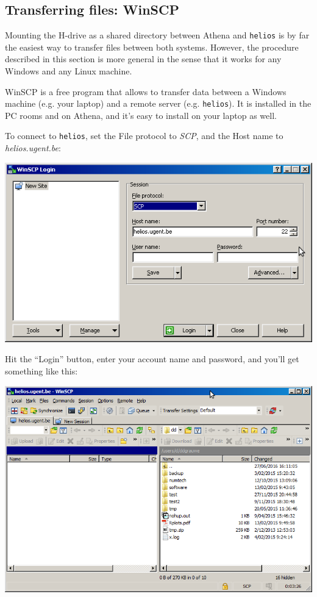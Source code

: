 \documentclass[a4paper]{article}
\begin{document}
\subsection{Transferring files: WinSCP\label{app:WinSCP}}
%
\par
Mounting the H-drive as a shared directory between Athena and \texttt{helios} is by far the easiest way to transfer files between both systems. However, the procedure described in this section is more general in the sense that it works for any Windows and any Linux machine.
%
\par
WinSCP is a free program that allows to transfer data between a Windows machine (e.g. your laptop) and a remote server (e.g. \texttt{helios}). It is installed in the PC rooms and on Athena, and it's easy to install on your laptop as well.
%
\par
To connect to \texttt{helios}, set the File protocol to \emph{SCP}, and the Host name to \emph{helios.ugent.be}:
%
\begin{center}
	\includegraphics[scale=.5]{winscp1.png}
\end{center}
%
Hit the ``Login'' button, enter your account name and password, and you'll get something like this:
%
\begin{center}
	\includegraphics[scale=.5]{winscp2.png}%
\end{center}
\end{document}
